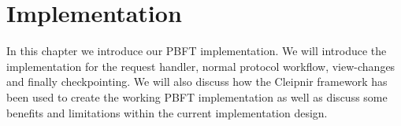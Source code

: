 \chapter{Implementation}

\label{chapter:Imp}
In this chapter we introduce our PBFT implementation. We will introduce the implementation for the request handler, normal protocol workflow, view-changes and finally checkpointing. We will also discuss how the Cleipnir framework has been used to create the working PBFT implementation as well as discuss some benefits and limitations within the current implementation design.



